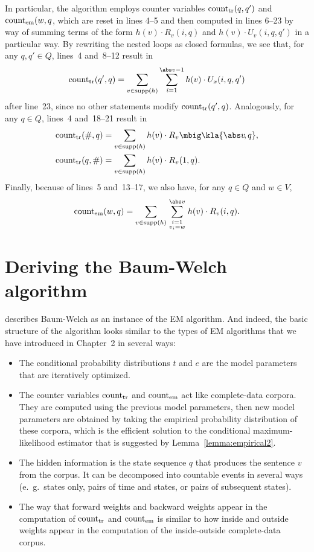In particular, the algorithm employs counter variables $\operatorname{count}_\mathrm{tr}(q,q')$
and $\operatorname{count}_\mathrm{em}(w,q$, which are reset in lines 4--5 and then computed in
lines 6--23 by way of summing terms of the form $h(v) \cdot R_v(i,q)$ and
$h(v)\cdot U_v(i,q,q')$ in a particular way. By rewriting the nested loops as
closed formulas, we see that, for any $q,q'\in Q$, lines~4 and~8--12 result in
\begin{equation}\label{eq:03-bw-start}
 \cnt_\mathrm{tr}(q',q) = \sum_{v\in\operatorname{supp}(h)} \sum_{i=1}^{\abs v-1} h(v) \cdot U_x(i,q,q')
\end{equation}
after line~23, since no other statements modify $\operatorname{count}_\mathrm{tr}(q',q)$.
Analogously, for any $q\in Q$, lines~4 and~18--21 result in
\begin{align}
 \cnt_\mathrm{tr}(\#,q) &= \sum_{v\in\operatorname{supp}(h)} h(v) \cdot R_v\mbig\kla{\abs v\!,q}, \\
 \cnt_\mathrm{tr}(q,\#) &= \sum_{v\in\operatorname{supp}(h)} h(v) \cdot R_v(1,q).
\end{align}
Finally, because of lines~5 and~13--17, we also have, for any $q\in Q$ and $w\in V$,
\begin{equation}\label{eq:03-bw-end}
 \cnt_\mathrm{em}(w,q) = \sum_{v\in\operatorname{supp}(h)} \sum_{{\scriptstyle i=1}\atop{\scriptstyle v_i=w}}^{\abs v} h(v) \cdot R_v(i,q).
\end{equation}

\section{Deriving the Baum-Welch algorithm}\label{sect:03-deriving}

\cite{jm09} describes Baum-Welch as an instance of the EM algorithm. And
indeed, the basic structure of the algorithm looks similar to the types of EM
algorithms that we have introduced in Chapter~2 in several ways:
\begin{itemize}
 \item The conditional probability distributions $t$ and $e$ are the model
  parameters that are iteratively optimized.
 \item The counter variables $\operatorname{count}_\mathrm{tr}$ and $\operatorname{count}_\mathrm{em}$ act like
  complete-data corpora. They are computed using the previous model parameters,
  then new model parameters are obtained by taking the empirical probability
  distribution of these corpora, which is the efficient solution to the
  conditional maximum-likelihood estimator that is suggested by
  Lemma~\ref{lemma:empirical2}.
 \item The hidden information is the state sequence $q$ that produces the
  sentence $v$ from the corpus. It can be decomposed into countable events in
  several ways (e.~g.~states only, pairs of time and states, or pairs of
  subsequent states).
 \item The way that forward weights and backward weights appear in the
  computation of $\operatorname{count}_\mathrm{tr}$ and $\operatorname{count}_\mathrm{em}$ is similar to how
  inside and outside weights appear in the computation of the inside-outside
  complete-data corpus.
\end{itemize}

